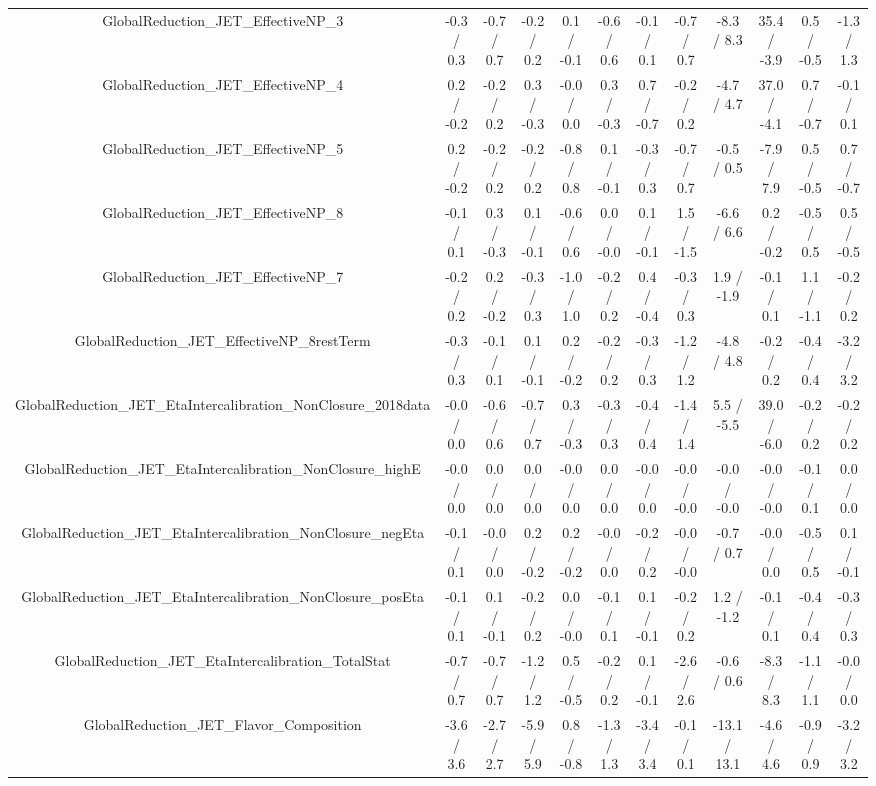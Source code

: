 \begin{table}[htbp]
\begin{center}
\begin{tabular}{|c|c|c|c|c|c|c|c|c|c|c|c|}
  GlobalReduction_JET_EffectiveNP_3 & -0.3 / 0.3 & -0.7 / 0.7 & -0.2 / 0.2 & 0.1 / -0.1 & -0.6 / 0.6 & -0.1 / 0.1 & -0.7 / 0.7 & -8.3 / 8.3 & 35.4 / -3.9 & 0.5 / -0.5 & -1.3 / 1.3 \\ 
  GlobalReduction_JET_EffectiveNP_4 & 0.2 / -0.2 & -0.2 / 0.2 & 0.3 / -0.3 & -0.0 / 0.0 & 0.3 / -0.3 & 0.7 / -0.7 & -0.2 / 0.2 & -4.7 / 4.7 & 37.0 / -4.1 & 0.7 / -0.7 & -0.1 / 0.1 \\ 
  GlobalReduction_JET_EffectiveNP_5 & 0.2 / -0.2 & -0.2 / 0.2 & -0.2 / 0.2 & -0.8 / 0.8 & 0.1 / -0.1 & -0.3 / 0.3 & -0.7 / 0.7 & -0.5 / 0.5 & -7.9 / 7.9 & 0.5 / -0.5 & 0.7 / -0.7 \\ 
  GlobalReduction_JET_EffectiveNP_8 & -0.1 / 0.1 & 0.3 / -0.3 & 0.1 / -0.1 & -0.6 / 0.6 & 0.0 / -0.0 & 0.1 / -0.1 & 1.5 / -1.5 & -6.6 / 6.6 & 0.2 / -0.2 & -0.5 / 0.5 & 0.5 / -0.5 \\ 
  GlobalReduction_JET_EffectiveNP_7 & -0.2 / 0.2 & 0.2 / -0.2 & -0.3 / 0.3 & -1.0 / 1.0 & -0.2 / 0.2 & 0.4 / -0.4 & -0.3 / 0.3 & 1.9 / -1.9 & -0.1 / 0.1 & 1.1 / -1.1 & -0.2 / 0.2 \\ 
  GlobalReduction_JET_EffectiveNP_8restTerm & -0.3 / 0.3 & -0.1 / 0.1 & 0.1 / -0.1 & 0.2 / -0.2 & -0.2 / 0.2 & -0.3 / 0.3 & -1.2 / 1.2 & -4.8 / 4.8 & -0.2 / 0.2 & -0.4 / 0.4 & -3.2 / 3.2 \\ 
  GlobalReduction_JET_EtaIntercalibration_NonClosure_2018data & -0.0 / 0.0 & -0.6 / 0.6 & -0.7 / 0.7 & 0.3 / -0.3 & -0.3 / 0.3 & -0.4 / 0.4 & -1.4 / 1.4 & 5.5 / -5.5 & 39.0 / -6.0 & -0.2 / 0.2 & -0.2 / 0.2 \\ 
  GlobalReduction_JET_EtaIntercalibration_NonClosure_highE & -0.0 / 0.0 & 0.0 / 0.0 & 0.0 / 0.0 & -0.0 / 0.0 & 0.0 / 0.0 & -0.0 / 0.0 & -0.0 / -0.0 & -0.0 / -0.0 & -0.0 / -0.0 & -0.1 / 0.1 & 0.0 / 0.0 \\ 
  GlobalReduction_JET_EtaIntercalibration_NonClosure_negEta & -0.1 / 0.1 & -0.0 / 0.0 & 0.2 / -0.2 & 0.2 / -0.2 & -0.0 / 0.0 & -0.2 / 0.2 & -0.0 / -0.0 & -0.7 / 0.7 & -0.0 / 0.0 & -0.5 / 0.5 & 0.1 / -0.1 \\ 
  GlobalReduction_JET_EtaIntercalibration_NonClosure_posEta & -0.1 / 0.1 & 0.1 / -0.1 & -0.2 / 0.2 & 0.0 / -0.0 & -0.1 / 0.1 & 0.1 / -0.1 & -0.2 / 0.2 & 1.2 / -1.2 & -0.1 / 0.1 & -0.4 / 0.4 & -0.3 / 0.3 \\ 
  GlobalReduction_JET_EtaIntercalibration_TotalStat & -0.7 / 0.7 & -0.7 / 0.7 & -1.2 / 1.2 & 0.5 / -0.5 & -0.2 / 0.2 & 0.1 / -0.1 & -2.6 / 2.6 & -0.6 / 0.6 & -8.3 / 8.3 & -1.1 / 1.1 & -0.0 / 0.0 \\ 
  GlobalReduction_JET_Flavor_Composition & -3.6 / 3.6 & -2.7 / 2.7 & -5.9 / 5.9 & 0.8 / -0.8 & -1.3 / 1.3 & -3.4 / 3.4 & -0.1 / 0.1 & -13.1 / 13.1 & -4.6 / 4.6 & -0.9 / 0.9 & -3.2 / 3.2 \\ 

\end{tabular}
\end{center}
\end{table}
